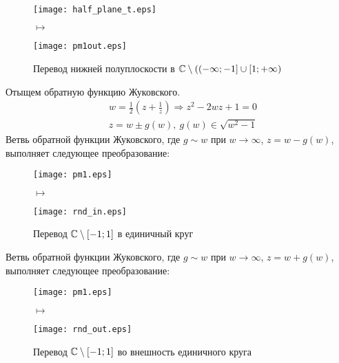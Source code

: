 \FloatBarrier
\Example
~
\\
\begin{figure}[h!]
    \begin{minipage}[c]{0.45\textwidth}
        \centering
        \texttt{[image: half\_plane\_t.eps]}
    \end{minipage}
    \begin{minipage}[c]{0.1\textwidth}
        \centering
        \LARGE{$\mapsto$}
    \end{minipage}
    \begin{minipage}[c]{0.45\textwidth}
        \centering
        \texttt{[image: pm1out.eps]}
    \end{minipage}
    \label{fig:24.13}
    \caption{Перевод нижней полуплоскости в $\mathbb{C} \setminus ((-\infty;-1]\cup[1;+\infty)$}
\end{figure}
\FloatBarrier
Отыщем обратную функцию Жуковского.
\begin{align*}
  & w = \frac{1}{2}\left( z+\frac{1}{z} \right) \Rightarrow z^2 - 2wz + 1 = 0
\end{align*}
\begin{align*}
  & z = w \pm g(w), \ g(w) \in \sqrt{w^2-1}
\end{align*}
\Example
Ветвь обратной функции Жуковского, где $g \sim w$ при $w \to \infty$, $z = w -
g(w)$, выполняет следующее преобразование:
\\
\begin{figure}[h!]
    \begin{minipage}[c]{0.45\textwidth}
        \centering
        \texttt{[image: pm1.eps]}
    \end{minipage}
    \label{fig:24.14}
    \begin{minipage}[c]{0.1\textwidth}
        \centering
        \LARGE{$\mapsto$}
    \end{minipage}
        \begin{minipage}[c]{0.45\textwidth}
        \centering
        \texttt{[image: rnd\_in.eps]}
    \end{minipage}
    \caption{Перевод $\mathbb{C} \setminus [-1;1]$ в единичный круг}
\end{figure}
\FloatBarrier
\Example
Ветвь обратной функции Жуковского, где $g \sim w$ при $w \to \infty$, $z = w +
g(w)$, выполняет следующее преобразование:
\\
\begin{figure}[h!]
        \begin{minipage}[c]{0.45\textwidth}
        \centering
        \texttt{[image: pm1.eps]}
    \end{minipage}
    \begin{minipage}[c]{0.1\textwidth}
        \centering
        \LARGE{$\mapsto$}
    \end{minipage}
        \begin{minipage}[c]{0.45\textwidth}
        \centering
        \texttt{[image: rnd\_out.eps]}
    \end{minipage}
    \label{fig:24.15}
    \caption{Перевод $\mathbb{C} \setminus [-1;1]$ во  внешность единичного круга}
\end{figure}
